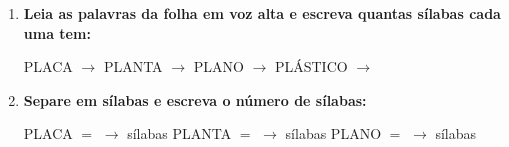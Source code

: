 \begin{exercicio}
\begin{enumerate}[resume]
  \item \textbf{Leia as palavras da folha em voz alta e escreva quantas sílabas cada uma tem:}

  \begin{center}
  PLACA $\rightarrow$ \underline{\hspace{1cm}} \quad PLANTA $\rightarrow$ \underline{\hspace{1cm}} \quad PLANO $\rightarrow$ \underline{\hspace{1cm}} \quad PLÁSTICO $\rightarrow$ \underline{\hspace{1cm}}
  \end{center}

  \item \textbf{Separe em sílabas e escreva o número de sílabas:}
  \begin{center}
  PLACA $=$ \underline{\hspace{1.2cm}} $\rightarrow$ \underline{\hspace{0.8cm}} sílabas \quad PLANTA $=$ \underline{\hspace{1.2cm}} $\rightarrow$ \underline{\hspace{0.8cm}} sílabas \quad PLANO $=$ \underline{\hspace{1.2cm}} $\rightarrow$ \underline{\hspace{0.8cm}} sílabas
  \end{center}

\end{enumerate}

\end{exercicio}



